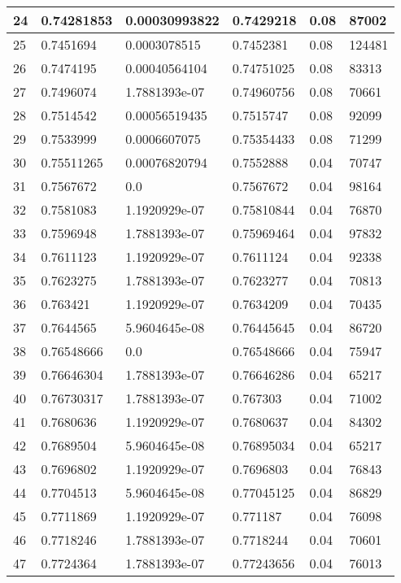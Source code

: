 \begin{longtable}{|l|l|l|l|l|l|}
24 & 0.74281853 & 0.00030993822 & 0.7429218 & 0.08 & 87002 \\ \hline 
25 & 0.7451694 & 0.0003078515 & 0.7452381 & 0.08 & 124481 \\ \hline 
26 & 0.7474195 & 0.00040564104 & 0.74751025 & 0.08 & 83313 \\ \hline 
27 & 0.7496074 & 1.7881393e-07 & 0.74960756 & 0.08 & 70661 \\ \hline 
28 & 0.7514542 & 0.00056519435 & 0.7515747 & 0.08 & 92099 \\ \hline 
29 & 0.7533999 & 0.0006607075 & 0.75354433 & 0.08 & 71299 \\ \hline 
30 & 0.75511265 & 0.00076820794 & 0.7552888 & 0.04 & 70747 \\ \hline 
31 & 0.7567672 & 0.0 & 0.7567672 & 0.04 & 98164 \\ \hline 
32 & 0.7581083 & 1.1920929e-07 & 0.75810844 & 0.04 & 76870 \\ \hline 
33 & 0.7596948 & 1.7881393e-07 & 0.75969464 & 0.04 & 97832 \\ \hline 
34 & 0.7611123 & 1.1920929e-07 & 0.7611124 & 0.04 & 92338 \\ \hline 
35 & 0.7623275 & 1.7881393e-07 & 0.7623277 & 0.04 & 70813 \\ \hline 
36 & 0.763421 & 1.1920929e-07 & 0.7634209 & 0.04 & 70435 \\ \hline 
37 & 0.7644565 & 5.9604645e-08 & 0.76445645 & 0.04 & 86720 \\ \hline 
38 & 0.76548666 & 0.0 & 0.76548666 & 0.04 & 75947 \\ \hline 
39 & 0.76646304 & 1.7881393e-07 & 0.76646286 & 0.04 & 65217 \\ \hline 
40 & 0.76730317 & 1.7881393e-07 & 0.767303 & 0.04 & 71002 \\ \hline 
41 & 0.7680636 & 1.1920929e-07 & 0.7680637 & 0.04 & 84302 \\ \hline 
42 & 0.7689504 & 5.9604645e-08 & 0.76895034 & 0.04 & 65217 \\ \hline 
43 & 0.7696802 & 1.1920929e-07 & 0.7696803 & 0.04 & 76843 \\ \hline 
44 & 0.7704513 & 5.9604645e-08 & 0.77045125 & 0.04 & 86829 \\ \hline 
45 & 0.7711869 & 1.1920929e-07 & 0.771187 & 0.04 & 76098 \\ \hline 
46 & 0.7718246 & 1.7881393e-07 & 0.7718244 & 0.04 & 70601 \\ \hline 
47 & 0.7724364 & 1.7881393e-07 & 0.77243656 & 0.04 & 76013 \\ \hline 

\end{longtable}
